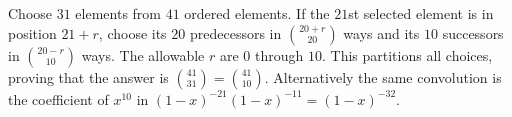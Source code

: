 Choose $31$ elements from $41$ ordered elements. If the $21$st selected element is in position $21+r$, choose its $20$ predecessors in $\binom{20+r}{20}$ ways and its $10$ successors in $\binom{20-r}{10}$ ways. The allowable $r$ are $0$ through $10$. This partitions all choices, proving that the answer is $\boxed{\binom{41}{31}}=\boxed{\binom{41}{10}}$. Alternatively the same convolution is the coefficient of $x^{10}$ in $(1-x)^{-21}(1-x)^{-11}=(1-x)^{-32}$.
